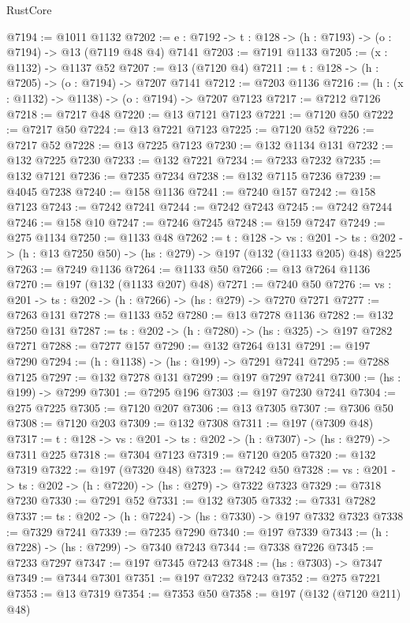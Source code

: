 \begin{lexlean}{RustCore}
\begin{coremodule}
@7194 := @1011 @1132
@7202 := {e : @7192} -> {t : @128} -> (h : @7193) -> (o : @7194) -> @13 (@7119 @48 @4) @7141
@7203 := @7191 @1133
@7205 := (x : @1132) -> @1137 @52
@7207 := @13 (@7120 @4)
@7211 := {t : @128} -> (h : @7205) -> (o : @7194) -> @7207 @7141
@7212 := @7203 @1136
@7216 := (h : (x : @1132) -> @1138) -> (o : @7194) -> @7207 @7123
@7217 := @7212 @7126
@7218 := @7217 @48
@7220 := @13 @7121 @7123
@7221 := @7120 @50
@7222 := @7217 @50
@7224 := @13 @7221 @7123
@7225 := @7120 @52
@7226 := @7217 @52
@7228 := @13 @7225 @7123
@7230 := @132 @1134 @131
@7232 := @132 @7225 @7230
@7233 := @132 @7221
@7234 := @7233 @7232
@7235 := @132 @7121
@7236 := @7235 @7234
@7238 := @132 @7115 @7236
@7239 := @4045 @7238
@7240 := @158 @1136
@7241 := @7240 @157
@7242 := @158 @7123
@7243 := @7242 @7241
@7244 := @7242 @7243
@7245 := @7242 @7244
@7246 := @158 @10
@7247 := @7246 @7245
@7248 := @159 @7247
@7249 := @275 @1134
@7250 := @1133 @48
@7262 := {t : @128} ->
  {vs : @201} ->
  {ts : @202} -> (h : @13 @7250 @50) -> (hs : @279) -> @197 (@132 (@1133 @205) @48) @225
@7263 := @7249 @1136
@7264 := @1133 @50
@7266 := @13 @7264 @1136
@7270 := @197 (@132 (@1133 @207) @48)
@7271 := @7240 @50
@7276 := {vs : @201} -> {ts : @202} -> (h : @7266) -> (hs : @279) -> @7270 @7271
@7277 := @7263 @131
@7278 := @1133 @52
@7280 := @13 @7278 @1136
@7282 := @132 @7250 @131
@7287 := {ts : @202} -> (h : @7280) -> (hs : @325) -> @197 @7282 @7271
@7288 := @7277 @157
@7290 := @132 @7264 @131
@7291 := @197 @7290
@7294 := (h : @1138) -> (hs : @199) -> @7291 @7241
@7295 := @7288 @7125
@7297 := @132 @7278 @131
@7299 := @197 @7297 @7241
@7300 := (hs : @199) -> @7299
@7301 := @7295 @196
@7303 := @197 @7230 @7241
@7304 := @275 @7225
@7305 := @7120 @207
@7306 := @13 @7305
@7307 := @7306 @50
@7308 := @7120 @203
@7309 := @132 @7308
@7311 := @197 (@7309 @48)
@7317 := {t : @128} -> {vs : @201} -> {ts : @202} -> (h : @7307) -> (hs : @279) -> @7311 @225
@7318 := @7304 @7123
@7319 := @7120 @205
@7320 := @132 @7319
@7322 := @197 (@7320 @48)
@7323 := @7242 @50
@7328 := {vs : @201} -> {ts : @202} -> (h : @7220) -> (hs : @279) -> @7322 @7323
@7329 := @7318 @7230
@7330 := @7291 @52
@7331 := @132 @7305
@7332 := @7331 @7282
@7337 := {ts : @202} -> (h : @7224) -> (hs : @7330) -> @197 @7332 @7323
@7338 := @7329 @7241
@7339 := @7235 @7290
@7340 := @197 @7339
@7343 := (h : @7228) -> (hs : @7299) -> @7340 @7243
@7344 := @7338 @7226
@7345 := @7233 @7297
@7347 := @197 @7345 @7243
@7348 := (hs : @7303) -> @7347
@7349 := @7344 @7301
@7351 := @197 @7232 @7243
@7352 := @275 @7221
@7353 := @13 @7319
@7354 := @7353 @50
@7358 := @197 (@132 (@7120 @211) @48)

\end{coremodule}
\end{lexlean}

